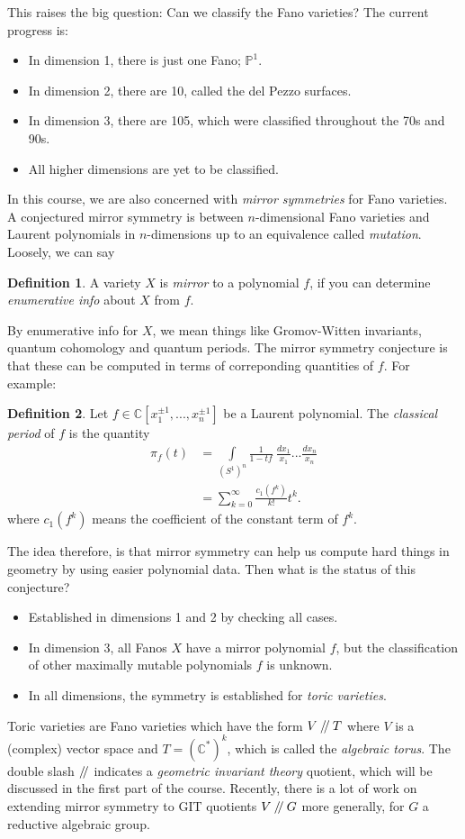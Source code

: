 \documentclass{article}
\theoremstyle{definition}
\newtheorem{defn}{Definition}
\newcommand{\C}{\mathbb{C}}
\newcommand{\bP}{\mathbb{P}}
\newcommand{\sslash}{\mathbin{/\mkern-4mu/}}
\begin{document}
This raises the big question: Can we classify the Fano varieties? The current progress is:
\begin{itemize}
	\item In dimension 1, there is just one Fano; $\bP^1$.
	\item In dimension 2, there are 10, called the del Pezzo surfaces.
	\item In dimension 3, there are 105, which were classified throughout the 70s and 90s.
	\item All higher dimensions are yet to be classified.
\end{itemize}
In this course, we are also concerned with \emph{mirror symmetries} for Fano varieties. A conjectured mirror symmetry is between $n$-dimensional Fano varieties and Laurent polynomials in $n$-dimensions up to an equivalence called \emph{mutation}. Loosely, we can say
\begin{defn}
	A variety $X$ is \emph{mirror} to a polynomial $f$, if you can determine \emph{enumerative info} about $X$ from $f$.
\end{defn} 
By enumerative info for $X$, we mean things like Gromov-Witten invariants, quantum cohomology and quantum periods. The mirror symmetry conjecture is that these can be computed in terms of correponding quantities of $f$. For example:
\begin{defn}
	Let $f \in \C[x_1^{\pm 1},...,x_n^{\pm 1}]$ be a Laurent polynomial. The \emph{classical period} of $f$ is the quantity
	\begin{align*}
		\pi_f(t) &= \int\limits_{(S^1)^n} \frac{1}{1-tf} ~\frac{dx_1}{x_1}...\frac{dx_n}{x_n}\\
		&= \sum_{k=0}^\infty \frac{c_1(f^k)}{k!}t^k.
	\end{align*}
	where $c_1(f^k)$ means the coefficient of the constant term of $f^k$.
\end{defn}
The idea therefore, is that mirror symmetry can help us compute hard things in geometry by using easier polynomial data. Then what is the status of this conjecture?
\begin{itemize}
	\item Established in dimensions 1 and 2 by checking all cases.
	\item In dimension 3, all Fanos $X$ have a mirror polynomial $f$, but the classification of other maximally mutable polynomials $f$ is unknown.
	\item In all dimensions, the symmetry is established for \emph{toric varieties}.
\end{itemize}
Toric varieties are Fano varieties which have the form $V\sslash T$ where $V$ is a (complex) vector space and $T=(\C^\ast)^k$, which is called the \emph{algebraic torus}. The double slash $\sslash$ indicates a \emph{geometric invariant theory} quotient, which will be discussed in the first part of the course. Recently, there is a lot of work on extending mirror symmetry to GIT quotients $V\sslash G$ more generally, for $G$ a reductive algebraic group. \vspace{1em}
\end{document}
